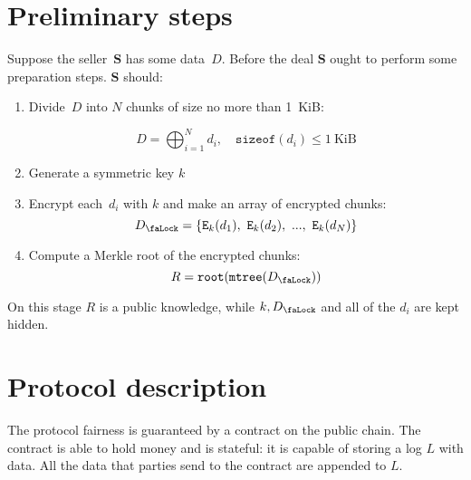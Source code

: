 \documentclass[a4paper]{article}
\newcommand{\Lock}{{D_\text{\faLock}}}
\newcommand{\Encrypt}{\mathtt{E}}
\newcommand{\MerkleTree}{\mathtt{mtree}}
\newcommand{\Root}{\mathtt{root}}
\newcommand{\Party}[1]{\mathbf{#1}}
\newcommand{\tParty}[1]{$\Party{#1}$}
\newcommand{\Key}[1]{#1}
\newcommand{\Concat}{\bigoplus}
\newcommand{\SizeOf}{\mathtt{sizeof}}
\begin{document}
\section{Preliminary steps}
Suppose the seller~\tParty{S} has some data~$D$. Before the deal \tParty{S} ought to perform some preparation steps. \tParty{S} should:
\begin{enumerate}
\item Divide~$D$ into $N$ chunks of size no more than 1~KiB:

\begin{equation}
D = \Concat_{i=1}^N d_i, \quad \SizeOf(d_i) \leq 1~\mathrm{KiB}
\end{equation}

\item Generate a symmetric key $k$
\item Encrypt each~$d_i$ with $k$ and make an array of encrypted chunks:
\begin{equation}
\Lock = \{ \Encrypt_\Key{k}(d_1),\ \Encrypt_\Key{k}(d_2),\ ...,\ \Encrypt_\Key{k}(d_N) \}
\end{equation}

\item Compute a Merkle root of the encrypted chunks:
\begin{equation}
R = \Root(\MerkleTree(\Lock))
\end{equation}

\end{enumerate}

On this stage $R$ is a public knowledge, while $k, \Lock$ and all of the $d_i$ are kept hidden.

\section{Protocol description}
The protocol fairness is guaranteed by a contract on the public chain. The contract is able to hold money and is stateful: it is capable of storing a log $L$ with data. All the data that parties send to the contract are appended to $L$.
\end{document}
